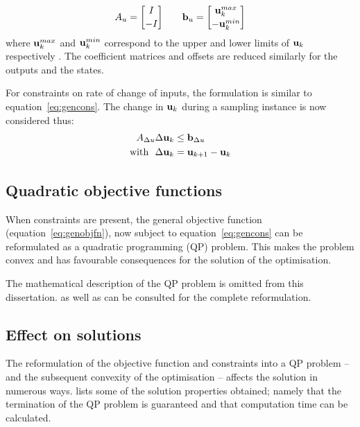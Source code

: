 \begin{align*}
  A_u={I\brack -I} \qquad {\bf {b}}_u={{\bf {u}}^{max}_k \brack -{\bf {u}}^{min}_k}
\end{align*}
where ${\bf {u}}^{max}_k$ and ${\bf {u}}^{min}_k$ correspond to the upper and lower limits of ${\bf {u}}_k$ respectively \citep[6]{rawlings}. 
The coefficient matrices and offsets are reduced similarly for the outputs and the states.

For constraints on rate of change of inputs, the formulation is similar to equation~\ref{eq:gencons}.
The change in ${\bf {u}}_k$ during a sampling instance is now considered thus:
\begin{align*}
  A_{\Delta u}\Delta {\bf {u}}_k &\leq {\bf {b}}_{\Delta u} \notag \\
  \text{with}~~ \Delta {\bf {u}}_k &= {\bf {u}}_{k+1}-{\bf {u}}_k
\end{align*}

\subsection{Quadratic objective functions}\label{sec:conobjfn}
When constraints are present, the general objective function (equation~\ref{eq:genobjfn}), now subject to equation~\ref{eq:gencons} can be reformulated as a quadratic programming (QP) problem.
This makes the problem convex and has favourable consequences for the solution of the optimisation.

The mathematical description of the QP problem is omitted from this dissertation.
\citet[81-83]{maciejowskimpc} as well as \citet[489-490]{rawlings} can be consulted for the complete reformulation.

\subsection{Effect on solutions}\label{sec:coneffsol}
The reformulation of the objective function and constraints into a QP problem -- and the subsequent convexity of the optimisation -- affects the solution in numerous ways.
\citet[83]{maciejowskimpc} lists some of the solution properties obtained; namely that the termination of the QP problem is guaranteed and that computation time can be calculated.

